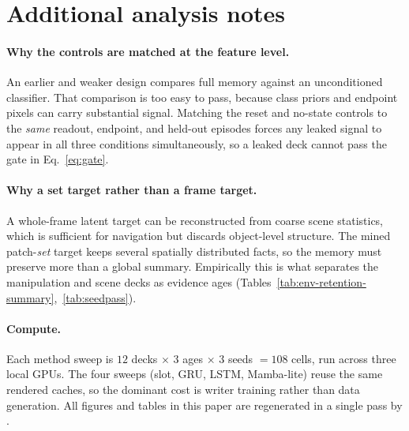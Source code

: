 

\section{Additional analysis notes}
\label{app:notes}

\paragraph{Why the controls are matched at the feature level.}
An earlier and weaker design compares full memory against an unconditioned
classifier.  That comparison is too easy to pass, because class priors and
endpoint pixels can carry substantial signal.  Matching the reset and no-state
controls to the \emph{same} readout, endpoint, and held-out episodes forces any
leaked signal to appear in all three conditions simultaneously, so a leaked deck
cannot pass the gate in Eq.~\eqref{eq:gate}.

\paragraph{Why a set target rather than a frame target.}
A whole-frame latent target can be reconstructed from coarse scene statistics,
which is sufficient for navigation but discards object-level structure.  The
mined patch-\emph{set} target keeps several spatially distributed facts, so the
memory must preserve more than a global summary.  Empirically this is what
separates the manipulation and scene decks as evidence ages
(Tables~\ref{tab:env-retention-summary},~\ref{tab:seedpass}).

\paragraph{Compute.}
Each method sweep is $12$ decks $\times$ $3$ ages $\times$ $3$ seeds $=108$
cells, run across three local GPUs.  The four sweeps (slot, GRU, LSTM,
Mamba-lite) reuse the same rendered caches, so the dominant cost is writer
training rather than data generation.  All figures and tables in this paper are
regenerated in a single pass by .
